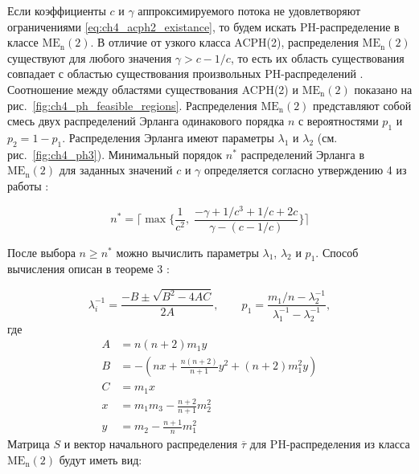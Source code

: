 Если коэффициенты $c$ и $\gamma$ аппроксимируемого потока не удовлетворяют ограничениями \eqref{eq:ch4_acph2_existance}, то будем искать PH-распределение в классе $\text{ME}_\text{n}(2)$. В отличие от узкого класса ACPH(2), распределения $\text{ME}_\text{n}(2)$ существуют для любого значения $\gamma > c - 1/c$, то есть их область существования совпадает с областью существования произвольных PH-распределений \cite{Johnson1989}. Соотношение между областями существования ACPH(2) и $\text{ME}_\text{n}(2)$ показано на рис.~\ref{fig:ch4_ph_feasible_regions}. Распределения $\text{ME}_\text{n}(2)$ представляют собой смесь двух распределений Эрланга одинакового порядка $n$ с вероятностями $p_1$ и $p_2 = 1 - p_1$. Распределения Эрланга имеют параметры $\lambda_1$ и $\lambda_2$ (см. рис.~\ref{fig:ch4_ph3}). Минимальный порядок $n^*$ распределений Эрланга в $\text{ME}_\text{n}(2)$ для заданных значений $c$ и $\gamma$ определяется согласно утверждению 4 из работы \cite{Johnson1989}:

\begin{equation}
    \label{eq:ch4_men2_min_n}
    n^* = \lceil \max \lbrace
            \frac{1}{c^2}, \;
            \frac{-\gamma + 1/c^3 + 1/c + 2c}{\gamma - (c - 1/c)}
        \rbrace \rceil
\end{equation}

После выбора $n \geqslant n^*$ можно вычислить параметры $\lambda_1$, $\lambda_2$ и $p_1$. Способ вычисления описан в теореме 3 \cite{Johnson1989}:

\begin{equation}
    \label{eq:ch4_men2_params}
    \lambda_i^{-1} = \frac{-B \pm \sqrt{B^2 - 4 A C}}{2 A}, \qquad
    p_1 = \frac{m_1/n - \lambda_2^{-1}}{\lambda_1^{-1} - \lambda_2^{-1}},
\end{equation}
где
\begin{equation}
    \label{eq:ch4_men2_params_aux}
    \begin{aligned}
        A &= n(n+2) m_1 y\\
        B &= -\left( nx + \frac{n(n+2)}{n+1}y^2 + (n+2) m_1^2 y \right)\\
        C &= m_1 x\\
        x &= m_1 m_3 - \frac{n+2}{n+1} m_2^2\\
        y &= m_2 - \frac{n+1}{n} m_1^2
    \end{aligned}
\end{equation}
Матрица $S$ и вектор начального распределения $\overline{\tau}$ для PH-распределения из класса $\text{ME}_\text{n}(2)$ будут иметь вид:

